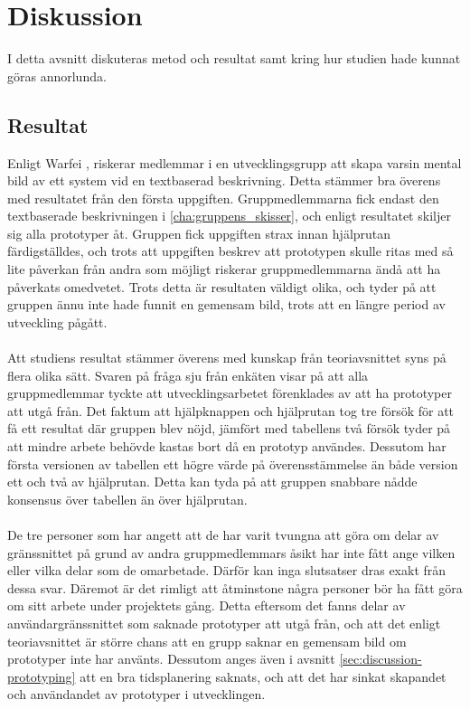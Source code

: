 \section{Diskussion}
\label{cha:rebecca-discussion}
I detta avsnitt diskuteras metod och resultat samt kring hur studien hade kunnat göras annorlunda. 
\subsection{Resultat}
\label{sec:rebecca-discussion-results}
Enligt Warfei \cite{prototyping-guide}, riskerar medlemmar i en utvecklingsgrupp att skapa varsin mental bild av ett system vid en textbaserad beskrivning. Detta stämmer bra överens med resultatet från den första uppgiften. Gruppmedlemmarna fick endast den textbaserade beskrivningen i  \ref{cha:gruppens_skisser}, och enligt resultatet skiljer sig alla prototyper åt. Gruppen fick uppgiften strax innan hjälprutan färdigställdes, och trots att uppgiften beskrev att prototypen skulle ritas med så lite påverkan från andra som möjligt riskerar gruppmedlemmarna ändå att ha påverkats omedvetet. Trots detta är resultaten väldigt olika, och tyder på att gruppen ännu inte hade funnit en gemensam bild, trots att en längre period av utveckling pågått.
\\ \\
Att studiens resultat stämmer överens med kunskap från teoriavsnittet syns på flera olika sätt. Svaren på fråga sju från enkäten visar på att alla gruppmedlemmar tyckte att utvecklingsarbetet förenklades av att ha prototyper att utgå från. Det faktum att hjälpknappen och hjälprutan tog tre försök för att få ett resultat där gruppen blev nöjd, jämfört med tabellens två försök tyder på att mindre arbete behövde kastas bort då en prototyp användes. Dessutom har första versionen av tabellen ett högre värde på överensstämmelse än både version ett och två av hjälprutan. Detta kan tyda på att gruppen snabbare nådde konsensus över tabellen än över hjälprutan.
\\ \\
De tre personer som har angett att de har varit tvungna att göra om delar av gränssnittet på grund av andra gruppmedlemmars åsikt har inte fått ange vilken eller vilka delar som de omarbetade. Därför kan inga slutsatser dras exakt från dessa svar. Däremot är det rimligt att åtminstone några personer bör ha fått göra om sitt arbete under projektets gång. Detta eftersom det fanns delar av användargränssnittet som saknade prototyper att utgå från, och att det enligt teoriavsnittet är större chans att en grupp saknar en gemensam bild om prototyper inte har använts. Dessutom anges även i avsnitt \ref{sec:discussion-prototyping} att en bra tidsplanering saknats, och att det har sinkat skapandet och användandet av prototyper i utvecklingen.

